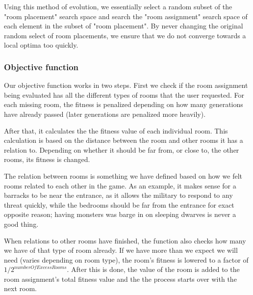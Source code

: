 Using this method of evolution, we essentially select a random subset of the "room placement" search space and search the "room assignment" search space of each element in the subset of "room placement". By never changing the original random select of room placements, we ensure that we do not converge towards a local optima too quickly.

\subsubsection{Objective function}
Our objective function works in two steps. First we check if the room assignment being evaluated has all the different types of rooms that the user requested. For each missing room, the fitness is penalized depending on how many generations have already passed (later generations are penalized more heavily).

After that, it calculates the the fitness value of each individual room. This calculation is based on the distance between the room and other rooms it has a relation to. Depending on whether it should be far from, or close to, the other rooms, its fitness is changed. 

The relation between rooms is something we have defined based on how we felt rooms related to each other in the game. As an example, it makes sense for a barracks to be near the entrance, as it allows the military to respond to any threat quickly, while the bedrooms should be far from the entrance for exact opposite reason; having monsters was barge in on sleeping dwarves is never a good thing.

When relations to other rooms have finished, the function also checks how many we have of that type of room already. If we have more than we expect we will need (varies depending on room type), the room's fitness is lowered to a factor of $1 / 2^{numberOfExcessRooms}$. After this is done, the value of the room is added to the room assignment's total fitness value and the the process starts over with the next room.

